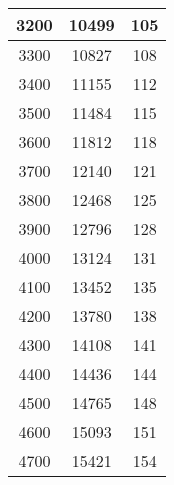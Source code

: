\documentclass[10pt]{article}
\begin{document}
\begin{table}[!ht]
\begin{tabular}{|c|c|c|}
      3200 & 10499 & 105 \\ \hline
      3300 & 10827 & 108 \\ \hline
      3400 & 11155 & 112 \\ \hline
      3500 & 11484 & 115 \\ \hline
      3600 & 11812 & 118 \\ \hline
      3700 & 12140 & 121 \\ \hline
      3800 & 12468 & 125 \\ \hline
      3900 & 12796 & 128 \\ \hline
      4000 & 13124 & 131 \\ \hline
      4100 & 13452 & 135 \\ \hline
      4200 & 13780 & 138 \\ \hline
      4300 & 14108 & 141 \\ \hline
      4400 & 14436 & 144 \\ \hline
      4500 & 14765 & 148 \\ \hline
      4600 & 15093 & 151 \\ \hline
      4700 & 15421 & 154 \\ \hline
  \end{tabular}
\end{table}
\end{document}
